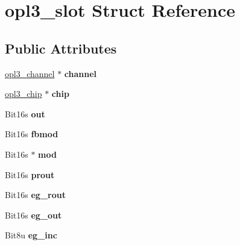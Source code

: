 \hypertarget{structopl3__slot}{\section{opl3\-\_\-slot Struct Reference}
\label{structopl3__slot}
}
\subsection*{Public Attributes}
\begin{DoxyCompactItemize}
\item 
\hypertarget{structopl3__slot_aa7ebab592cdbebcc77b32aa61fbef77b}{\hyperlink{structopl3__channel}{opl3\-\_\-channel} $\ast$ {\bfseries channel}}\label{structopl3__slot_aa7ebab592cdbebcc77b32aa61fbef77b}

\item 
\hypertarget{structopl3__slot_a54e27937487e752acc66193e02383afb}{\hyperlink{structopl3__chip}{opl3\-\_\-chip} $\ast$ {\bfseries chip}}\label{structopl3__slot_a54e27937487e752acc66193e02383afb}

\item 
\hypertarget{structopl3__slot_ac07b5fc1c5170983c77ddbc40d1593ac}{Bit16s {\bfseries out}}\label{structopl3__slot_ac07b5fc1c5170983c77ddbc40d1593ac}

\item 
\hypertarget{structopl3__slot_a70845640b68d51e483e784990ab9ffd1}{Bit16s {\bfseries fbmod}}\label{structopl3__slot_a70845640b68d51e483e784990ab9ffd1}

\item 
\hypertarget{structopl3__slot_a70973c215a6681d4b12448f670ddfca8}{Bit16s $\ast$ {\bfseries mod}}\label{structopl3__slot_a70973c215a6681d4b12448f670ddfca8}

\item 
\hypertarget{structopl3__slot_a1a0045ead51a3ba02544b681be9351eb}{Bit16s {\bfseries prout}}\label{structopl3__slot_a1a0045ead51a3ba02544b681be9351eb}

\item 
\hypertarget{structopl3__slot_a4e79dd82c0747376d5a4406be09eb63b}{Bit16s {\bfseries eg\-\_\-rout}}\label{structopl3__slot_a4e79dd82c0747376d5a4406be09eb63b}

\item 
\hypertarget{structopl3__slot_ac42d83a30ffed2cd5d3672300e123531}{Bit16s {\bfseries eg\-\_\-out}}\label{structopl3__slot_ac42d83a30ffed2cd5d3672300e123531}

\item 
\hypertarget{structopl3__slot_a9326930a79cbe3dee54b23d9decfe57d}{Bit8u {\bfseries eg\-\_\-inc}}\label{structopl3__slot_a9326930a79cbe3dee54b23d9decfe57d}


\end{DoxyCompactItemize}
